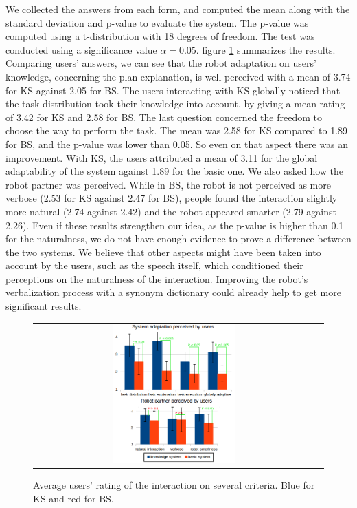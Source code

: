 We collected the answers from each form, and computed the mean along with the standard deviation and p-value to evaluate the system. The p-value was computed using a t-distribution with 18 degrees of freedom. The test was conducted using a significance value $\alpha=0.05$.
figure \ref{fig:plan_management-results} summarizes the results. Comparing users' answers, we can see that the robot adaptation on users' knowledge, concerning the plan explanation, is well perceived with a mean of 3.74 for KS against 2.05 for BS. The users interacting with KS globally noticed that the task distribution took their knowledge into account, by giving a mean rating of 3.42 for KS and 2.58 for BS. The last question concerned the freedom to choose the way to perform the task. The mean was 2.58 for KS compared to 1.89 for BS, and the p-value was lower than 0.05. So even on that aspect there was an improvement. 
With KS, the users attributed a mean of 3.11 for the global adaptability of the system against 1.89 for the basic one.
We also asked how the robot partner was perceived. While in BS, the robot is not perceived as more verbose (2.53 for KS against 2.47 for BS), people found the interaction slightly more natural (2.74 against 2.42) and the robot appeared smarter (2.79 against 2.26). Even if these results strengthen our idea, as the p-value is higher than 0.1 for the naturalness, we do not have enough evidence to prove a difference between the two systems. We believe that other aspects might have been taken into account by the users, such as the speech itself, which conditioned their perceptions on the naturalness of the interaction. Improving the robot's verbalization process with a synonym dictionary could already help to get more significant results.



 \begin{figure}[ht!]
 \centering
 \begin{tabular}{cc}
  \includegraphics[width=0.45\textwidth]{img/plan_management/respvalue3.png}
 \end{tabular}
 \caption{Average users' rating of the interaction on several criteria. Blue for KS and red for BS.}
 \label{fig:plan_management-results}
 \end{figure}

